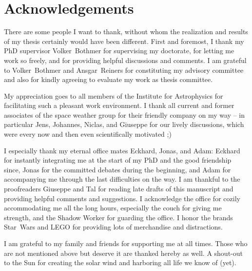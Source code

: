 
\chapter*{Acknowledgements}

There are some people I want to thank, without whom the realization and results of my thesis certainly would have been different.
First and foremost, I thank my PhD supervisor Volker~Bothmer for supervising my doctorate, for letting me work so freely, and for providing helpful discussions and comments.
I am grateful to Volker~Bothmer and Ansgar~Reiners for constituting my advisory committee and also for kindly agreeing to evaluate my work as thesis committee.

My appreciation goes to all members of the Institute for Astrophysics for facilitating such a pleasant work environment.
I thank all current and former associates of the space weather group for their friendly company on my way -- in particular Jens, Johannes, Niclas, and Giuseppe for our lively discussions, which were every now and then even scientifically motivated ;)

I especially thank my eternal office mates Eckhard, Jonas, and Adam:
Eckhard for instantly integrating me at the start of my PhD and the good friendship since,
Jonas for the committed debates during the beginning,
and Adam for accompanying me through the last difficulties on the way.
I am thankful to the proofreaders Giuseppe and Tal for reading late drafts of this manuscript and providing helpful comments and suggestions.
I acknowledge the office for cozily accommodating me all the long hours, especially the couch for giving me strength, and the Shadow Worker for guarding the office. I honor the brands Star~Wars and LEGO for providing lots of merchandise and distractions.

I am grateful to my family and friends for supporting me at all times.
Those who are not mentioned above but deserve it are thanked hereby as well.
A shout-out to the Sun for creating the solar wind and harboring all life we know of (yet).




